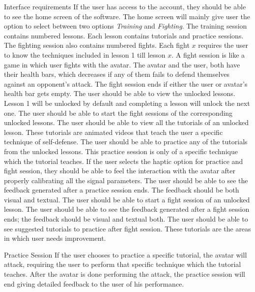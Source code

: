 \begin{outline}
 \1 Interface requirements
  \2 If the user has access to the account, they should be able to see the home screen of the software. The home screen will mainly give user the option to select between two options \textit{Training} and \textit{Fighting}.
  \2 The training session contains numbered lessons. Each lesson contains tutorials and practice sessions. 
  \2 The fighting session also contains numbered fights. Each fight $x$ requires the user to know the techniques included in lesson 1 till lesson $x$. A fight session is like a game in which user fights with the avatar. The avatar and the user, both have their health bars, which decreases if any of them fails to defend themselves against an opponent's attack. The fight session ends if either the user or avatar’s health bar gets empty. 
  \2 The user should be able to view the unlocked lessons. Lesson 1 will be unlocked by default and completing a lesson will unlock the next one. 
  \2 The user should be able to start the fight sessions of the corresponding unlocked lessons. 
  \2 The user should be able to view all the tutorials of an unlocked lesson. These tutorials are animated videos that teach the user a specific technique of self-defense. 
  \2 The user should be able to practice any of the tutorials from the unlocked lessons. This practice session is only of a specific technique which the tutorial teaches. 
  \2 If the user selects the haptic option for practice and fight session, they should be able to feel the interaction with the avatar after properly calibrating all the signal parameters.
  \2 The user should be able to see the feedback generated after a practice session ends. The feedback should be both visual and textual.
  \2 The user should be able to start a fight session of an unlocked lesson.
  \2 The user should be able to see the feedback generated after a fight session ends; the feedback should be visual and textual both.
  \2 The user should be able to see suggested tutorials to practice after fight session. These tutorials are the areas in which user needs improvement. 
  
 \1 Practice Session
   \2 If the user chooses to practice a specific tutorial, the avatar will attack, requiring the user to perform that specific technique which the tutorial teaches.  After the avatar is done performing the attack, the practice session will end giving detailed feedback to the user of his performance. 
 

\end{outline}
